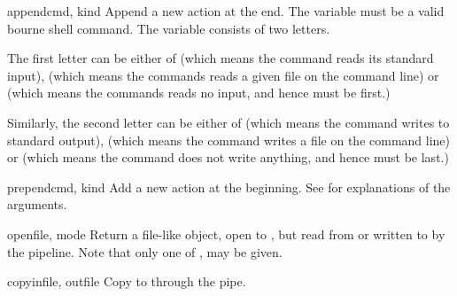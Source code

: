 \begin{methoddesc}{append}{cmd, kind}
Append a new action at the end. The  variable must be a valid
bourne shell command. The  variable consists of two letters.

The first letter can be either of  (which means the command
reads its standard input),  (which means the commands reads
a given file on the command line) or  (which means the commands
reads no input, and hence must be first.)

Similarly, the second letter can be either of  (which means 
the command writes to standard output),  (which means the 
command writes a file on the command line) or  (which means
the command does not write anything, and hence must be last.)
\end{methoddesc}

\begin{methoddesc}{prepend}{cmd, kind}
Add a new action at the beginning. See  for explanations
of the arguments.
\end{methoddesc}

\begin{methoddesc}{open}{file, mode}
Return a file-like object, open to , but read from or
written to by the pipeline.  Note that only one of ,
 may be given.
\end{methoddesc}

\begin{methoddesc}{copy}{infile, outfile}
Copy  to  through the pipe.
\end{methoddesc}
